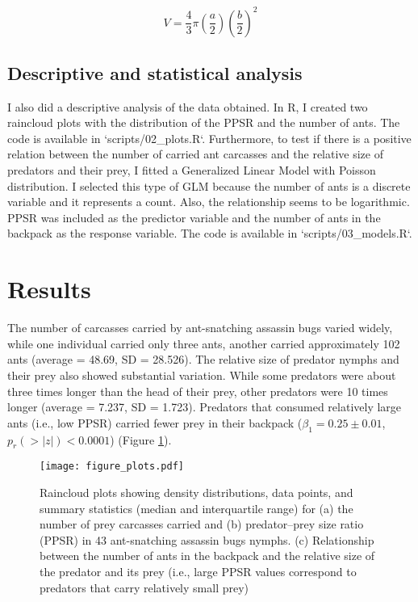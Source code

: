 \documentclass{article}
\begin{document}
\begin{equation}
    V = \frac{4}{3}\pi(\frac{a}{2})(\frac{b}{2})^{2}
\end{equation}

\subsection{Descriptive and statistical analysis}

I also did a descriptive analysis of the data obtained. In R, I created two raincloud plots with the distribution of the PPSR and the number of ants. The code is available in `scripts/02\_plots.R`. Furthermore, to test if there is a positive relation between the number of carried ant carcasses and the relative size of predators and their prey, I fitted a Generalized Linear Model with Poisson distribution. I selected this type of GLM because the number of ants is a discrete variable and it represents a count. Also, the relationship seems to be logarithmic. PPSR was included as the predictor variable and the number of ants in the backpack as the response variable. The code is available in `scripts/03\_models.R`.

\section{Results}

The number of carcasses carried by ant-snatching
assassin bugs varied widely, while one individual carried only three ants, another carried approximately 102 ants (average = 48.69, SD = 28.526). The relative size of predator nymphs and their prey also showed substantial variation. While some predators were about three times longer than the head of their prey, other predators were 10 times longer (average = 7.237,
SD = 1.723). Predators that consumed relatively large ants (i.e., low PPSR) carried fewer prey in their backpack ($\beta_1 = 0.25 \pm 0.01$,
$p_r(>|z|) < 0.0001$) (Figure \ref{figure_plots}). 
\\

\begin{figure}
    \centering
    \texttt{[image: figure\_plots.pdf]}
    \caption{Raincloud plots showing density distributions, data points, and summary statistics (median and interquartile range) for (a) the
number of prey carcasses carried and (b) predator–prey
size ratio (PPSR) in 43 ant-snatching
assassin bugs nymphs. (c) Relationship between
the number of ants in the backpack and the relative size of the predator and its prey (i.e., large PPSR values correspond to predators that
carry relatively small prey)}
    \label{figure_plots}
\end{figure}
\end{document}
